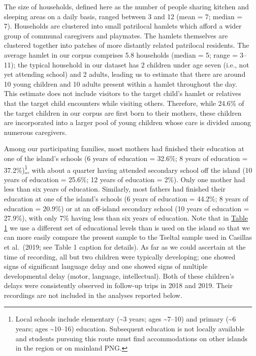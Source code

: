 \documentclass[
  english,
  ,man,floatsintext]{apa6}
\begin{document}
The size of households, defined here as the number of people sharing kitchen and sleeping areas on a daily basis, ranged between 3 and 12 (mean = 7; median = 7). Households are clustered into small patrilocal hamlets which afford a wider group of communal caregivers and playmates. The hamlets themselves are clustered together into patches of more distantly related patrilocal residents. The average hamlet in our corpus comprises 5.8 households (median = 5; range = 3--11); the typical household in our dataset has 2 children under age seven (i.e., not yet attending school) and 2 adults, leading us to estimate that there are around 10 young children and 10 adults present within a hamlet throughout the day. This estimate does not include visitors to the target child's hamlet or relatives that the target child encounters while visiting others. Therefore, while 24.6\% of the target children in our corpus are first born to their mothers, these children are incorporated into a larger pool of young children whose care is divided among numerous caregivers.

Among our participating families, most mothers had finished their education at one of the island's schools (6 years of education = 32.6\%; 8 years of education = 37.2\%)\footnote{Local schools include elementary (\textasciitilde3 years; ages \textasciitilde7--10) and primary (\textasciitilde6 years; ages \textasciitilde10--16) education. Subsequent education is not locally available and students pursuing this route must find accommodations on other islands in the region or on mainland PNG.}, with about a quarter having attended secondary school off the island (10 years of education = 25.6\%; 12 years of education = 2\%). Only one mother had less than six years of education. Similarly, most fathers had finished their education at one of the island's schools (6 years of education = 44.2\%; 8 years of education = 20.9\%) or at an off-island secondary school (10 years of education = 27.9\%), with only 7\% having less than six years of education. Note that in \protect\hyperlink{tab1}{Table 1} we use a different set of educational levels than is used on the island so that we can more easily compare the present sample to the Tseltal sample used in Casillas et al.~(2019; see Table 1 caption for details). As far as we could ascertain at the time of recording, all but two children were typically developing; one showed signs of significant language delay and one showed signs of multiple developmental delay (motor, language, intellectual). Both of these children's delays were consistently observed in follow-up trips in 2018 and 2019. Their recordings are not included in the analyses reported below.
\end{document}
